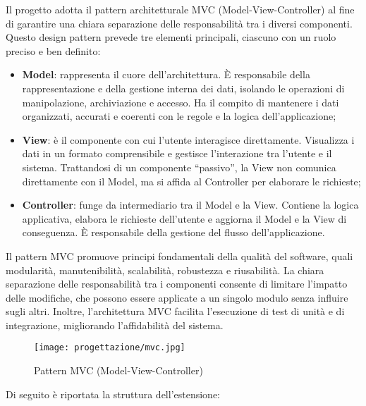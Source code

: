 \par Il progetto adotta il pattern architetturale MVC (Model-View-Controller) al fine di garantire una chiara separazione delle responsabilità tra i diversi componenti. Questo design pattern prevede tre elementi principali, ciascuno con un ruolo preciso e ben definito:
\begin{itemize}
  \item \textbf{Model}: rappresenta il cuore dell’architettura. È responsabile della rappresentazione e della gestione interna dei dati, isolando le operazioni di manipolazione, archiviazione e accesso. Ha il compito di mantenere i dati organizzati, accurati e coerenti con le regole e la logica dell’applicazione;
  \item \textbf{View}: è il componente con cui l’utente interagisce direttamente. Visualizza i dati in un formato comprensibile e gestisce l’interazione tra l’utente e il sistema. Trattandosi di un componente “passivo”, la View non comunica direttamente con il Model, ma si affida al Controller per elaborare le richieste;
  \item \textbf{Controller}: funge da intermediario tra il Model e la View. Contiene la logica applicativa, elabora le richieste dell’utente e aggiorna il Model e la View di conseguenza. È responsabile della gestione del flusso dell’applicazione.
\end{itemize}

\vspace{5pt}
\par\noindent Il pattern MVC promuove principi fondamentali della qualità del software, quali modularità, manutenibilità, scalabilità, robustezza e riusabilità. La chiara separazione delle responsabilità tra i componenti consente di limitare l’impatto delle modifiche, che possono essere applicate a un singolo modulo senza influire sugli altri. Inoltre, l’architettura MVC facilita l’esecuzione di test di unità e di integrazione, migliorando l’affidabilità del sistema.

\begin{figure}[H] 
    \centering 
    \texttt{[image: progettazione/mvc.jpg]} 
    \caption{Pattern MVC (Model-View-Controller)}
\end{figure}

\par\noindent Di seguito è riportata la struttura dell'estensione:

\vspace{10pt}
\begin{samepage}
\end{samepage}

